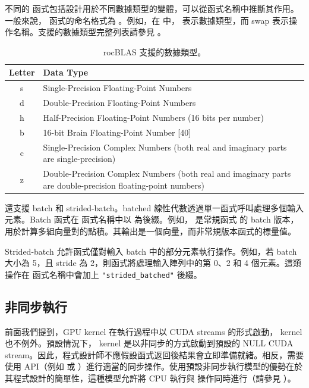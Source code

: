 不同的  函式包括設計用於不同數據類型的變體，可以從函式名稱中推斷其作用。一般來說， 函式的命名格式為 。例如，在  中， 表示數據類型，而 swap 表示操作名稱。支援的數據類型完整列表請參見 。

\begin{table}[h!]
    \centering
    \caption{rocBLAS 支援的數據類型。}
    \label{tab:rocblas_data_types}
    \begin{tabular}{cl}
        \hline
        \textbf{Letter} & \textbf{Data Type} \\ \hline
        s & Single-Precision Floating-Point Numbers \\ 
        d & Double-Precision Floating-Point Numbers \\ 
        h & Half-Precision Floating-Point Numbers (16 bits per number) \\ 
        b & 16-bit Brain Floating-Point Number [40] \\ 
        c & Single-Precision Complex Numbers (both real and imaginary parts are single-precision) \\
        z & Double-Precision Complex Numbers (both real and imaginary parts are double-precision floating-point numbers) \\ \hline
    \end{tabular}
\end{table}

 還支援 batch 和 strided-batch。batched 線性代數透過單一函式呼叫處理多個輸入元素。Batch 函式在  函式名稱中以  為後綴。例如， 是常規函式  的 batch 版本，用於計算多組向量對的點積。其輸出是一個向量，而非常規版本函式的標量值。

Strided-batch 允許函式僅對輸入 batch 中的部分元素執行操作。例如，若 batch 大小為 5，且 stride 為 2，則函式將處理輸入陣列中的第 0、2 和 4 個元素。這類操作在  函式名稱中會加上 \texttt{"strided\_batched"} 後綴。

\subsection{非同步執行}
前面我們提到，GPU kernel 在執行過程中以 CUDA streams 的形式啟動， kernel 也不例外。預設情況下， kernel 是以非同步的方式啟動到預設的 NULL CUDA stream。因此，程式設計師不應假設函式返回後結果會立即準備就緒。相反，需要使用  API（例如  或 ）進行適當的同步操作。使用預設非同步執行模型的優勢在於其程式設計的簡單性，這種模型允許將 CPU 執行與  操作同時進行（請參見 ）。

